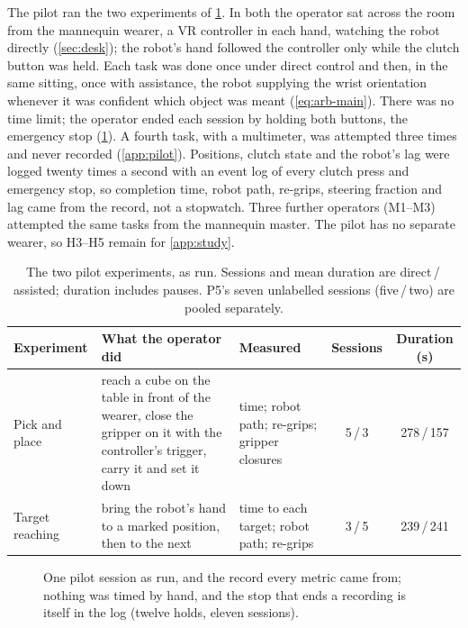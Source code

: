 The pilot ran the two experiments of \cref{tab:tasks}. In both the
operator sat across the room from the mannequin wearer, a VR controller in
each hand, watching the robot directly (\cref{sec:desk}); the robot's hand
followed the controller only while the clutch button was held. Each task was
done
once under direct control and then, in the same sitting, once with
assistance, the robot supplying the wrist orientation whenever it was
confident which object was meant (\cref{eq:arb-main}). There was no time
limit; the operator ended each session by holding both buttons, the
emergency stop (\cref{fig:pilot-procedure}). A fourth task, with
a multimeter, was attempted three times and never recorded
(\cref{app:pilot}). Positions, clutch state and the robot's lag were logged
twenty times a second with an event log of every clutch press and emergency
stop, so completion time, robot path, re-grips, steering fraction and lag
came from the record, not a stopwatch. Three further operators (M1--M3)
attempted the same tasks from the mannequin master. The pilot has no
separate wearer, so H3--H5 remain for \cref{app:study}.

\begin{table}[htbp]
  \centering
  \small
  \caption[The two pilot experiments]{The two pilot experiments, as
  run. Sessions and mean duration are direct\,/\,assisted; duration
  includes pauses. P5's seven unlabelled sessions (five\,/\,two) are pooled
  separately.}
  \label{tab:tasks}
  \begin{tabular}{@{}p{2.1cm}p{5.3cm}p{2.9cm}cc@{}}
    \toprule
    Experiment & What the operator did & Measured & Sessions & Duration (s) \\
    \midrule
    Pick and place & reach a cube on the table in front of the wearer,
    close the gripper on it with the controller's trigger, carry it and set
    it down & time; robot path; re-grips; gripper closures & 5\,/\,3 &
    278\,/\,157 \\
    Target reaching & bring the robot's hand to a marked position, then to
    the next & time to each target; robot path; re-grips & 3\,/\,5 &
    239\,/\,241 \\
    \bottomrule
  \end{tabular}
\end{table}

\begin{figure}[htbp]
  \centering
  
  \caption[One pilot session, as run]{One pilot session as run, and the
  record every metric came from; nothing was timed by hand, and the stop
  that ends a recording is itself in the log (twelve holds, eleven sessions).}
  \label{fig:pilot-procedure}
\end{figure}
